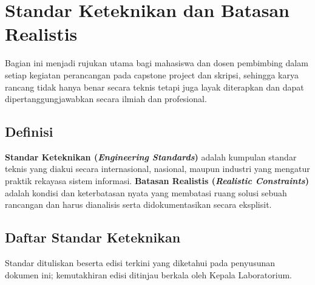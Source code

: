 \documentclass[12pt,a4paper]{report}
\begin{document}
\chapter{Standar Keteknikan dan Batasan Realistis}
\label{chap:standar}

Bagian ini menjadi rujukan utama bagi mahasiswa dan dosen pembimbing dalam setiap kegiatan perancangan pada capstone project dan skripsi, sehingga karya rancang tidak hanya benar secara teknis tetapi juga layak diterapkan dan dapat dipertanggungjawabkan secara il\-mi\-ah dan pro\-fe\-sio\-nal.

\section{Definisi}
\textbf{Standar Keteknikan (\emph{Engineering Standards})} adalah kumpulan standar teknis yang diakui secara internasional, nasional, maupun industri yang mengatur praktik rekayasa sistem informasi. \textbf{Batasan Realistis (\emph{Realistic Constraints})} adalah kondisi dan keterbatasan nyata yang membatasi ruang solusi sebuah rancangan dan harus dianalisis serta didokumentasikan secara eksplisit.

\section{Daftar Standar Keteknikan}
Standar dituliskan beserta edisi terkini yang diketahui pada penyusunan dokumen ini; kemutakhiran edisi ditinjau berkala oleh Kepala Laboratorium.
\end{document}
